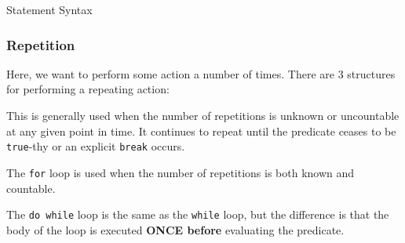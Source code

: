 \begin{listing}[h!tbp]
\caption{\texorpdfstring{}{\texttt{switch case}} Statement Syntax}
\label{lst:switch_case_Statement}
\end{listing}

\subsubsection{Repetition}\label{subsubsec:Repetition}
Here, we want to perform some action a number of times.
There are 3 structures for performing a repeating action:
\begin{description}[noitemsep]
\item[\nameref{par:while_Loop} Loop] This is generally used when the number of repetitions is unknown or uncountable at any given point in time.
  It continues to repeat until the predicate ceases to be \texttt{true}-thy or an explicit \texttt{break} occurs.

\item[\nameref{par:for_Loop} Loop] The \texttt{for} loop is used when the number of repetitions is both known and countable.

\item[\nameref{par:dowhile_Loop} Loop] The \texttt{do while} loop is the same as the \texttt{while} loop, but the difference is that the body of the loop is executed \textbf{ONCE before} evaluating the predicate.
\end{description}



